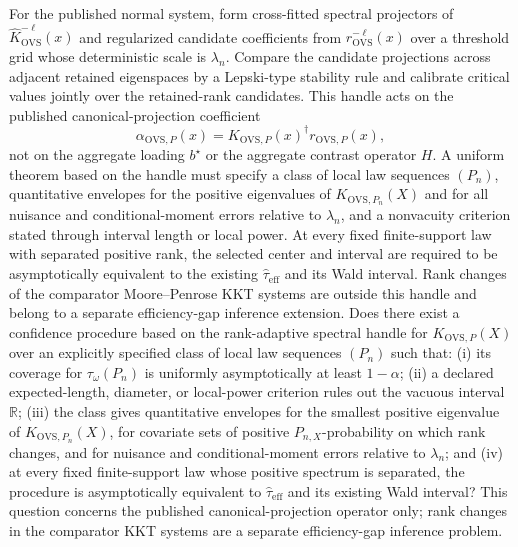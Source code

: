 For the published normal system, form cross-fitted spectral projectors of \(\widehat K_{\mathrm{OVS}}^{-\ell}(x)\) and regularized candidate coefficients from \(\widehat r_{\mathrm{OVS}}^{-\ell}(x)\) over a threshold grid whose deterministic scale is \(\lambda_n\).  Compare the candidate projections across adjacent retained eigenspaces by a Lepski-type stability rule and calibrate critical values jointly over the retained-rank candidates.  This handle acts on the published canonical-projection coefficient
\[
\alpha_{\mathrm{OVS},P}(x)=K_{\mathrm{OVS},P}(x)^\dagger r_{\mathrm{OVS},P}(x),
\]
not on the aggregate loading \(b^\star\) or the aggregate contrast operator \(H\).  A uniform theorem based on the handle must specify a class of local law sequences \((P_n)\), quantitative envelopes for the positive eigenvalues of \(K_{\mathrm{OVS},P_n}(X)\) and for all nuisance and conditional-moment errors relative to \(\lambda_n\), and a nonvacuity criterion stated through interval length or local power.  At every fixed finite-support law with separated positive rank, the selected center and interval are required to be asymptotically equivalent to the existing \(\widehat\tau_{\mathrm{eff}}\) and its Wald interval.  Rank changes of the comparator Moore--Penrose KKT systems are outside this handle and belong to a separate efficiency-gap inference extension.
Does there exist a confidence procedure based on the rank-adaptive spectral handle for \(K_{\mathrm{OVS},P}(X)\) over an explicitly specified class of local law sequences \((P_n)\) such that: (i) its coverage for \(\tau_\omega(P_n)\) is uniformly asymptotically at least \(1-\alpha\); (ii) a declared expected-length, diameter, or local-power criterion rules out the vacuous interval \(\mathbb R\); (iii) the class gives quantitative envelopes for the smallest positive eigenvalue of \(K_{\mathrm{OVS},P_n}(X)\), for covariate sets of positive \(P_{n,X}\)-probability on which rank changes, and for nuisance and conditional-moment errors relative to \(\lambda_n\); and (iv) at every fixed finite-support law whose positive spectrum is separated, the procedure is asymptotically equivalent to \(\widehat\tau_{\mathrm{eff}}\) and its existing Wald interval?  This question concerns the published canonical-projection operator only; rank changes in the comparator KKT systems are a separate efficiency-gap inference problem.

